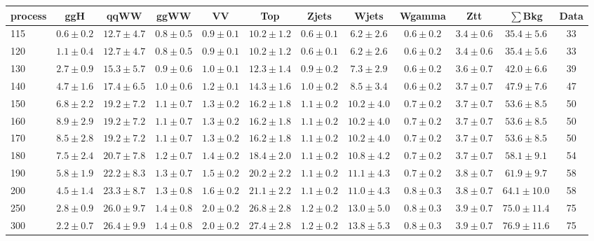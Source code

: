 \begin{table}
{\footnotesize
 \begin{center}
 \begin{tabular}{l c c c c c c c c c c c }
 \hline
 process & ggH & qqWW & ggWW & VV & Top & Zjets & Wjets & Wgamma & Ztt & $\sum$Bkg & Data \\
 \hline
115 & $0.6\pm0.2$ & $12.7\pm4.7$ & $0.8\pm0.5$ & $0.9\pm0.1$ & $10.2\pm1.2$ & $0.6\pm0.1$ & $6.2\pm2.6$ & $0.6\pm0.2$ & $3.4\pm0.6$ & $35.4\pm5.6$ & 33 \\
120 & $1.1\pm0.4$ & $12.7\pm4.7$ & $0.8\pm0.5$ & $0.9\pm0.1$ & $10.2\pm1.2$ & $0.6\pm0.1$ & $6.2\pm2.6$ & $0.6\pm0.2$ & $3.4\pm0.6$ & $35.4\pm5.6$ & 33 \\
130 & $2.7\pm0.9$ & $15.3\pm5.7$ & $0.9\pm0.6$ & $1.0\pm0.1$ & $12.3\pm1.4$ & $0.9\pm0.2$ & $7.3\pm2.9$ & $0.6\pm0.2$ & $3.6\pm0.7$ & $42.0\pm6.6$ & 39 \\
140 & $4.7\pm1.6$ & $17.4\pm6.5$ & $1.0\pm0.6$ & $1.2\pm0.1$ & $14.3\pm1.6$ & $1.0\pm0.2$ & $8.5\pm3.4$ & $0.6\pm0.2$ & $3.7\pm0.7$ & $47.9\pm7.6$ & 47 \\
150 & $6.8\pm2.2$ & $19.2\pm7.2$ & $1.1\pm0.7$ & $1.3\pm0.2$ & $16.2\pm1.8$ & $1.1\pm0.2$ & $10.2\pm4.0$ & $0.7\pm0.2$ & $3.7\pm0.7$ & $53.6\pm8.5$ & 50 \\
160 & $8.9\pm2.9$ & $19.2\pm7.2$ & $1.1\pm0.7$ & $1.3\pm0.2$ & $16.2\pm1.8$ & $1.1\pm0.2$ & $10.2\pm4.0$ & $0.7\pm0.2$ & $3.7\pm0.7$ & $53.6\pm8.5$ & 50 \\
170 & $8.5\pm2.8$ & $19.2\pm7.2$ & $1.1\pm0.7$ & $1.3\pm0.2$ & $16.2\pm1.8$ & $1.1\pm0.2$ & $10.2\pm4.0$ & $0.7\pm0.2$ & $3.7\pm0.7$ & $53.6\pm8.5$ & 50 \\
180 & $7.5\pm2.4$ & $20.7\pm7.8$ & $1.2\pm0.7$ & $1.4\pm0.2$ & $18.4\pm2.0$ & $1.1\pm0.2$ & $10.8\pm4.2$ & $0.7\pm0.2$ & $3.7\pm0.7$ & $58.1\pm9.1$ & 54 \\
190 & $5.8\pm1.9$ & $22.2\pm8.3$ & $1.3\pm0.7$ & $1.5\pm0.2$ & $20.2\pm2.2$ & $1.1\pm0.2$ & $11.1\pm4.3$ & $0.7\pm0.2$ & $3.8\pm0.7$ & $61.9\pm9.7$ & 58 \\
200 & $4.5\pm1.4$ & $23.3\pm8.7$ & $1.3\pm0.8$ & $1.6\pm0.2$ & $21.1\pm2.2$ & $1.1\pm0.2$ & $11.0\pm4.3$ & $0.8\pm0.3$ & $3.8\pm0.7$ & $64.1\pm10.0$ & 58 \\
250 & $2.8\pm0.9$ & $26.0\pm9.7$ & $1.4\pm0.8$ & $2.0\pm0.2$ & $26.8\pm2.8$ & $1.2\pm0.2$ & $13.0\pm5.0$ & $0.8\pm0.3$ & $3.9\pm0.7$ & $75.0\pm11.4$ & 75 \\
300 & $2.2\pm0.7$ & $26.4\pm9.9$ & $1.4\pm0.8$ & $2.0\pm0.2$ & $27.4\pm2.8$ & $1.2\pm0.2$ & $13.8\pm5.3$ & $0.8\pm0.3$ & $3.9\pm0.7$ & $76.9\pm11.6$ & 75 \\

\end{tabular}
\end{center}}
\end{table}
